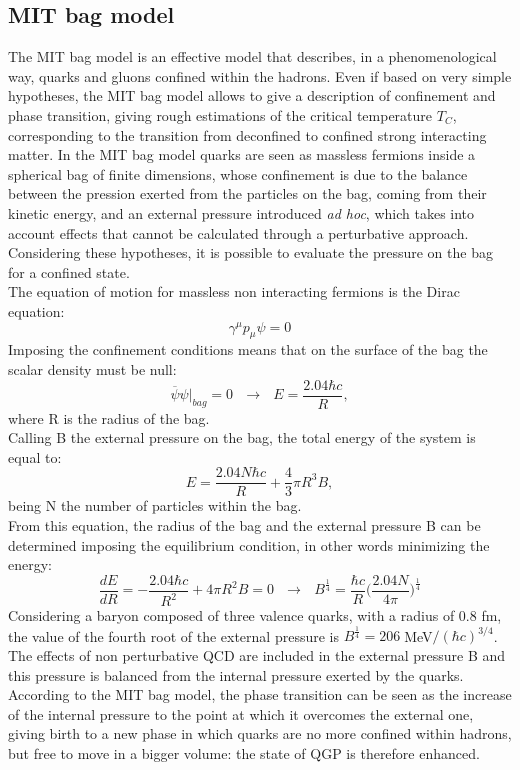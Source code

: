 \subsection{MIT bag model}
The MIT bag model is an effective model that describes, in a phenomenological way, quarks and gluons confined within the hadrons. Even if based on very simple hypotheses, the MIT bag model allows to give a description of confinement and phase transition, giving rough estimations of the critical temperature $T_{C}$, corresponding to the transition from deconfined to confined strong interacting matter. In the MIT bag model quarks are seen as massless fermions inside a spherical bag of finite dimensions, whose confinement is due to the balance between the pression exerted from the particles on the bag, coming from their kinetic energy, and an external pressure introduced \textit{ad hoc}, which takes into account effects that cannot be calculated through a perturbative approach. Considering these hypotheses, it is possible to evaluate the pressure on the bag for a confined state.\\
The equation of motion for massless non interacting fermions is the Dirac equation:
%
\begin{equation}
  \gamma^{\mu}p_{\mu}\psi=0
\end{equation}
%
Imposing the confinement conditions means that on the surface of the bag the scalar density must be null:
%
\begin{equation}
  \overbar{\psi}\psi \Big|_{bag} = 0 \ \ \ \longrightarrow \ \ \ E = \frac{2.04 \hbar c}{R},
\end{equation}
%
where R is the radius of the bag.\\
Calling B the external pressure on the bag, the total energy of the system is equal to:
%
\begin{equation}
  E = \frac{2.04N \hbar c}{R} + \frac{4}{3} \pi R^{3} B,
\end{equation}
%
being N the number of particles within the bag.\\
From this equation, the radius of the bag and the external pressure B can be determined imposing the equilibrium condition, in other words minimizing the energy:
%
\begin{equation}
  \frac{dE}{dR} = -\frac{2.04 \hbar c}{R^{2}} + 4 \pi R^{2} B = 0 \ \ \ \longrightarrow \ \ \ B^{\frac{1}{4}} = \frac{\hbar c}{R}\Big(\frac{2.04N}{4\pi}\Big)^{\frac{1}{4}}
\end{equation}
%
Considering a baryon composed of three valence quarks, with a radius of 0.8 fm, the value of the fourth root of the external pressure is $B^{\frac{1}{4}} = 206 \; $MeV$ / (\hbar c)^{3/4}$. The effects of non perturbative QCD are included in the external pressure B and this pressure is balanced from the internal pressure exerted by the quarks. According to the MIT bag model, the phase transition can be seen as the increase of the internal pressure to the point at which it overcomes the external one, giving birth to a new phase in which quarks are no more confined within hadrons, but free to move in a bigger volume: the state of QGP is therefore enhanced.\\
